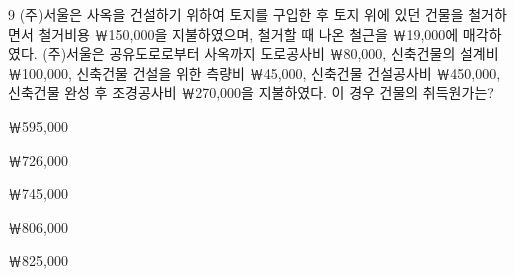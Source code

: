 \begin{question}{9}
(주)서울은 사옥을 건설하기 위하여 토지를 구입한 후 토지 위에 있던 건물을 철거하면서 철거비용 ￦150,000을 지불하였으며, 철거할 때 나온 철근을 ￦19,000에 매각하였다. (주)서울은 공유도로로부터 사옥까지 도로공사비 ￦80,000, 신축건물의 설계비 ￦100,000, 신축건물 건설을 위한 측량비 ￦45,000, 신축건물 건설공사비 ￦450,000, 신축건물 완성 후 조경공사비 ￦270,000을 지불하였다. 이 경우 건물의 취득원가는?
\begin{choices}
  \item ￦595,000
  \item ￦726,000
  \item ￦745,000
  \item ￦806,000
  \item ￦825,000
\end{choices}
\end{question}
